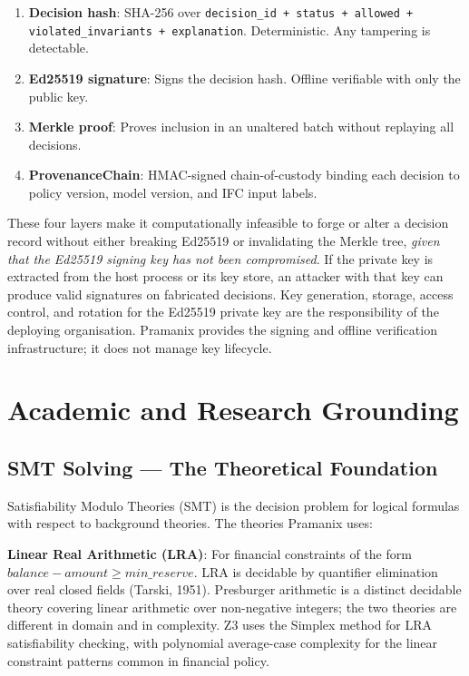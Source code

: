 \documentclass[12pt,a4paper,oneside]{report}
\newcommand{\code}[1]{\texttt{#1}}           %
\begin{document}
\begin{enumerate}
  \item \textbf{Decision hash}: SHA-256 over \code{decision\_id + status +
        allowed + violated\_invariants + explanation}. Deterministic. Any
        tampering is detectable.
  \item \textbf{Ed25519 signature}: Signs the decision hash. Offline
        verifiable with only the public key.
  \item \textbf{Merkle proof}: Proves inclusion in an unaltered batch without
        replaying all decisions.
  \item \textbf{ProvenanceChain}: HMAC-signed chain-of-custody binding each
        decision to policy version, model version, and IFC input labels.
\end{enumerate}

These four layers make it computationally infeasible to forge or alter a
decision record without either breaking Ed25519 or invalidating the Merkle
tree, \emph{given that the Ed25519 signing key has not been compromised}.  If
the private key is extracted from the host process or its key store, an
attacker with that key can produce valid signatures on fabricated decisions.
Key generation, storage, access control, and rotation for the Ed25519 private
key are the responsibility of the deploying organisation.  Pramanix provides
the signing and offline verification infrastructure; it does not manage key
lifecycle.

\chapter{Academic and Research Grounding}

\section{SMT Solving --- The Theoretical Foundation}

Satisfiability Modulo Theories (SMT) is the decision problem for logical
formulas with respect to background theories. The theories Pramanix uses:

\textbf{Linear Real Arithmetic (LRA)}: For financial constraints of the form
$\mathit{balance} - \mathit{amount} \geq \mathit{min\_reserve}$.  LRA is
decidable by quantifier elimination over real closed fields (Tarski, 1951).
Presburger arithmetic is a distinct decidable theory covering linear
arithmetic over non-negative integers; the two theories are different in
domain and in complexity.  Z3 uses the Simplex method for LRA satisfiability
checking, with polynomial average-case complexity for the linear constraint
patterns common in financial policy.
\end{document}
